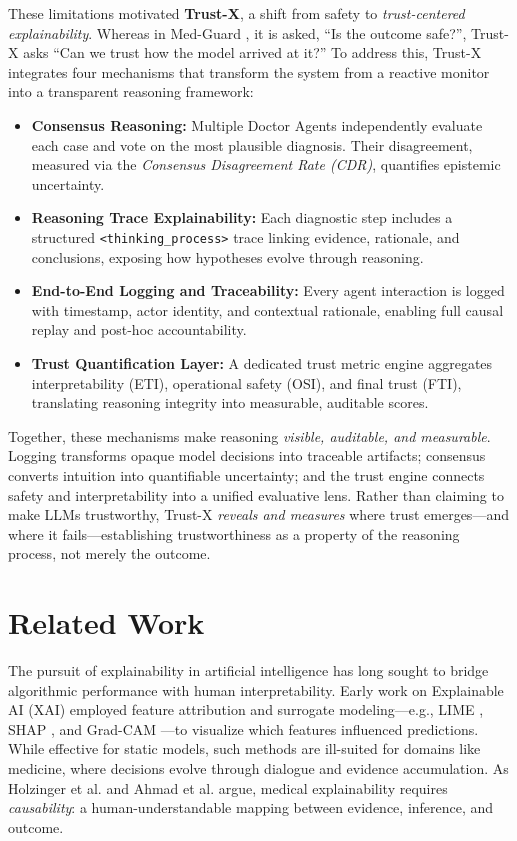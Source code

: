 \documentclass[letterpaper]{article} %
\begin{document}
These limitations motivated \textbf{Trust-X}, a shift from safety to \emph{trust-centered explainability}. 
Whereas in Med-Guard \cite{jain2025medguard}, it is asked, “Is the outcome safe?”, Trust-X asks “Can we trust how the model arrived at it?” 
To address this, Trust-X integrates four mechanisms that transform the system from a reactive monitor into a transparent reasoning framework:
\begin{itemize}
    \item \textbf{Consensus Reasoning:} Multiple Doctor Agents independently evaluate each case and vote on the most plausible diagnosis. Their disagreement, measured via the \emph{Consensus Disagreement Rate (CDR)}, quantifies epistemic uncertainty.
    \item \textbf{Reasoning Trace Explainability:} Each diagnostic step includes a structured \texttt{<thinking\_process>} trace linking evidence, rationale, and conclusions, exposing how hypotheses evolve through reasoning.
    \item \textbf{End-to-End Logging and Traceability:} Every agent interaction is logged with timestamp, actor identity, and contextual rationale, enabling full causal replay and post-hoc accountability.
    \item \textbf{Trust Quantification Layer:} A dedicated trust metric engine aggregates interpretability (ETI), operational safety (OSI), and final trust (FTI), translating reasoning integrity into measurable, auditable scores.
\end{itemize}

Together, these mechanisms make reasoning \emph{visible, auditable, and measurable}. 
Logging transforms opaque model decisions into traceable artifacts; consensus converts intuition into quantifiable uncertainty; and the trust engine connects safety and interpretability into a unified evaluative lens. 
Rather than claiming to make LLMs trustworthy, Trust-X \emph{reveals and measures} where trust emerges—and where it fails—establishing trustworthiness as a property of the reasoning process, not merely the outcome.


\section{Related Work}

The pursuit of explainability in artificial intelligence has long sought to bridge algorithmic performance with human interpretability. Early work on Explainable AI (XAI) employed feature attribution and surrogate modeling—e.g., LIME \cite{ribeiro2016should}, SHAP \cite{lundberg2017unified}, and Grad-CAM \cite{selvaraju2017grad}—to visualize which features influenced predictions. While effective for static models, such methods are ill-suited for domains like medicine, where decisions evolve through dialogue and evidence accumulation. As Holzinger et al. \cite{holzinger2019causability} and Ahmad et al. \cite{ahmad2018interpretable} argue, medical explainability requires \emph{causability}: a human-understandable mapping between evidence, inference, and outcome.
\end{document}
